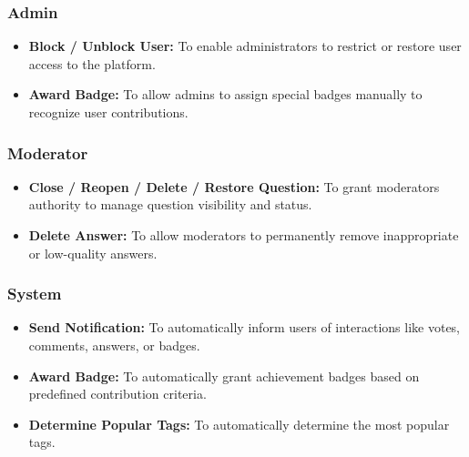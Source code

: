 \subsubsection{Admin}\label{c-EjaMXHWXMYpN7pbMGn4}

\begin{itemize}
\item
\protect{}\label{U0ElkZkzKBMP6N7y4vbxW}
\textbf{Block / Unblock User:} To enable administrators to restrict or restore user access to the platform.
\item
\protect{}\label{b0D9Dx6jZfpaJO24Get15}
\textbf{Award Badge:} To allow admins to assign special badges manually to recognize user contributions.
\end{itemize}

\subsubsection{Moderator}\label{h4ESnO7fkn46xMWJg1wPN}

\begin{itemize}
\item
\protect{}\label{db5ui158FSKbEMuKoZ6Af}
\textbf{Close / Reopen / Delete / Restore Question:} To grant moderators authority to manage question visibility and status.
\item
\protect{}\label{ENZEomqRoxDP4CHLtfD1o}
\textbf{Delete Answer:} To allow moderators to permanently remove inappropriate or low-quality answers.
\end{itemize}

\subsubsection{System}\label{a5Q-HeDaKYUz6lbpB96PB}

\begin{itemize}
\item
\protect{}\label{JQ9sptSON0dMuLknILv7z}
\textbf{Send Notification:} To automatically inform users of interactions like votes, comments, answers, or badges.
\item
\protect{}\label{WGWba8uaIqxgotOHhJmOx}
\textbf{Award Badge:} To automatically grant achievement badges based on predefined contribution criteria.
\item
\protect{}\label{WNtDiUngTfZ0hP7P0-G-0}
\textbf{Determine Popular Tags:} To automatically determine the most popular tags.
\end{itemize}

